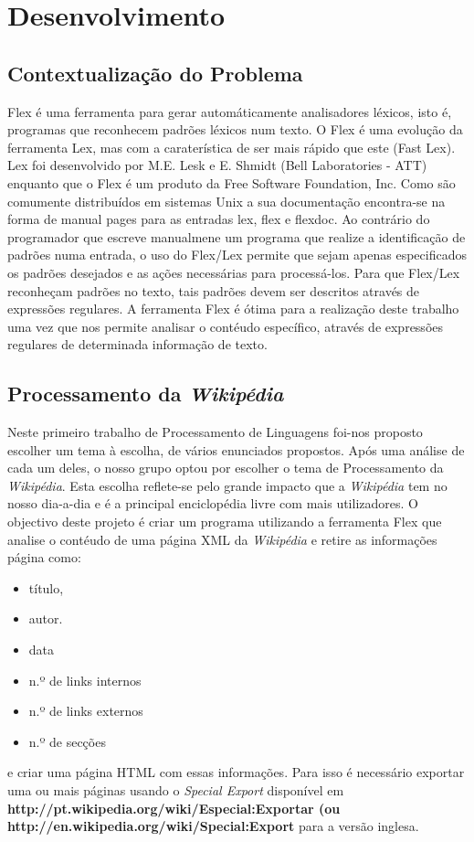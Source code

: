 \documentclass[11pt, a4paper, oneside]{article}
\begin{document}
\newpage
\section{Desenvolvimento}

\subsection{Contextualização do Problema}

Flex é uma ferramenta para gerar automáticamente analisadores léxicos, isto é, programas que reconhecem padrões léxicos num texto. O Flex é uma evolução da ferramenta Lex, mas com a caraterística de ser mais rápido que este (Fast Lex). Lex foi desenvolvido por M.E. Lesk e E. Shmidt (Bell Laboratories - ATT) enquanto que o Flex é um produto da Free Software Foundation, Inc. Como são comumente distribuídos em sistemas Unix a sua documentação encontra-se na forma de manual pages para as entradas lex, flex e flexdoc. Ao contrário do programador que escreve manualmene um programa que realize a identificação de padrões numa entrada, o uso do Flex/Lex permite que sejam apenas especificados os padrões desejados e as ações necessárias para processá-los. Para que Flex/Lex reconheçam padrões no texto, tais padrões devem ser descritos através de expressões regulares. A ferramenta Flex é ótima para a realização deste trabalho uma vez que nos permite analisar o contéudo específico, através de expressões regulares de determinada informação de texto.

\subsection{Processamento da \textit{Wikipédia}}
Neste primeiro trabalho de Processamento de Linguagens foi-nos proposto escolher um tema à escolha, de vários enunciados propostos. Após uma análise de cada um deles, o nosso grupo optou por escolher o tema de Processamento da \textit{Wikipédia}. Esta escolha reflete-se pelo grande impacto que a \textit{Wikipédia} tem no nosso dia-a-dia e é a principal enciclopédia livre com mais utilizadores. 
O objectivo deste projeto é criar um programa utilizando a ferramenta Flex que analise o contéudo de uma página XML da \textit{Wikipédia} e retire as informações página como:
\begin{itemize}
\item título,
\item autor.
\item data
\item n.º de links internos
\item n.º de links externos
\item n.º de secções 
\end{itemize}
e criar uma página HTML com essas informações. Para isso é necessário exportar uma ou mais páginas usando o \textit{Special Export} disponível em \textbf{http://pt.wikipedia.org/wiki/Especial:Exportar (ou \\http://en.wikipedia.org/wiki/Special:Export} para a versão inglesa.
\end{document}
